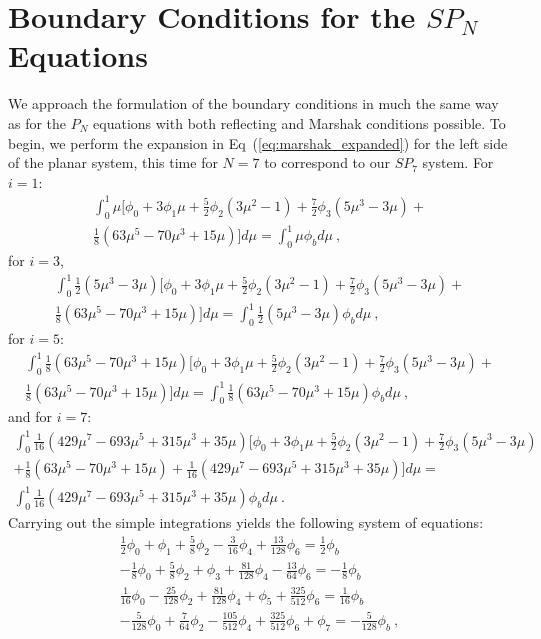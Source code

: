 \chapter{Boundary Conditions for the $SP_N$ Equations}
\label{chap:spn_boundary_conditions}
We approach the formulation of the boundary conditions in much the
same way as for the $P_N$ equations with both reflecting and Marshak
conditions possible. To begin, we perform the expansion in
Eq~(\ref{eq:marshak_expanded}) for the left side of the planar system,
this time for $N=7$ to correspond to our $SP_7$ system. For $i=1$:
\begin{multline}
  \int_0^1 \mu \Bigg[ \phi_0 + 3\phi_1\mu +
    \frac{5}{2}\phi_2(3\mu^2-1) + \frac{7}{2}\phi_3(5\mu^3-3\mu)
    +\\ \frac{1}{8}(63\mu^5-70\mu^3+15\mu) \Bigg] d\mu = \int_0^1 \mu
  \phi_b d\mu\:,
  \label{eq:spn_bnd_p1}
\end{multline}
for $i=3$,
\begin{multline}
  \int_0^1 \frac{1}{2}(5\mu^3-3\mu) \Bigg[ \phi_0 + 3\phi_1\mu +
    \frac{5}{2}\phi_2(3\mu^2-1) + \frac{7}{2}\phi_3(5\mu^3-3\mu) +\\
    \frac{1}{8}(63\mu^5-70\mu^3+15\mu) \Bigg] d\mu = \int_0^1
  \frac{1}{2}(5\mu^3-3\mu) \phi_b d\mu\:,
  \label{eq:spn_bnd_p3}
\end{multline}
for $i=5$:
\begin{multline}
  \int_0^1 \frac{1}{8}(63\mu^5-70\mu^3+15\mu) \Bigg[ \phi_0 + 3\phi_1\mu +
    \frac{5}{2}\phi_2(3\mu^2-1) + \frac{7}{2}\phi_3(5\mu^3-3\mu) +\\
    \frac{1}{8}(63\mu^5-70\mu^3+15\mu) \Bigg] d\mu = \int_0^1
  \frac{1}{8}(63\mu^5-70\mu^3+15\mu) \phi_b d\mu\:,
  \label{eq:spn_bnd_p5}
\end{multline}
and for $i=7$:
\begin{multline}
  \int_0^1 \frac{1}{16}(429\mu^7-693\mu^5+315\mu^3+35\mu) \Bigg[
    \phi_0 + 3\phi_1\mu + \frac{5}{2}\phi_2(3\mu^2-1) +
    \frac{7}{2}\phi_3(5\mu^3-3\mu) \\+
    \frac{1}{8}(63\mu^5-70\mu^3+15\mu) +
    \frac{1}{16}(429\mu^7-693\mu^5+315\mu^3+35\mu) \Bigg] d\mu =\\
  \int_0^1 \frac{1}{16}(429\mu^7-693\mu^5+315\mu^3+35\mu) \phi_b
  d\mu\:.
  \label{eq:spn_bnd_p7}
\end{multline}
Carrying out the simple integrations yields the following system of
equations:
\begin{subequations}
  \begin{gather}
    \frac{1}{2}\phi_0 + \phi_1 + \frac{5}{8}\phi_2 -
    \frac{3}{16}\phi_4 + \frac{13}{128}\phi_6 =
    \frac{1}{2}\phi_{b}\\ -\frac{1}{8}\phi_0 + \frac{5}{8}\phi_2 +
    \phi_3 + \frac{81}{128}\phi_4 - \frac{13}{64}\phi_6 =
    -\frac{1}{8}\phi_{b}\\ \frac{1}{16}\phi_0 - \frac{25}{128}\phi_2 +
    \frac{81}{128}\phi_4 + \phi_5 + \frac{325}{512}\phi_6 =
    \frac{1}{16}\phi_{b}\\ -\frac{5}{128}\phi_0 + \frac{7}{64}\phi_2 -
    \frac{105}{512}\phi_4 + \frac{325}{512}\phi_6 + \phi_7 =
    -\frac{5}{128}\phi_{b}\:,
  \end{gather}
  \label{eq:spn_bnd_integrated}
\end{subequations}
